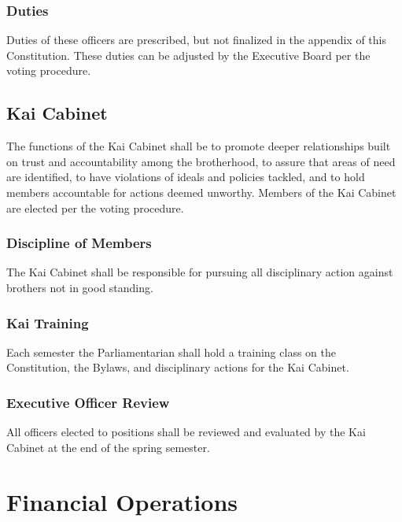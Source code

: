 \subsection{Duties}
\label{sec:duties}

Duties of these officers are prescribed, but not finalized in the appendix of
this Constitution.
These duties can be adjusted by the Executive Board per the voting procedure.

\section{Kai Cabinet}
\label{sec:kai-cabinet}

The functions of the Kai Cabinet shall be to promote deeper relationships built
on trust and accountability among the brotherhood, to assure that areas of need
are identified, to have violations of ideals and policies tackled, and to hold
members accountable for actions deemed unworthy.
Members of the Kai Cabinet are elected per the voting procedure.

\subsection{Discipline of Members}
\label{sec:discipline-of-members}

The Kai Cabinet shall be responsible for pursuing all disciplinary action
against brothers not in good standing.

\subsection{Kai Training}
\label{sec:kai-training}

Each semester the Parliamentarian shall hold a training class on the
Constitution, the Bylaws, and disciplinary actions for the Kai Cabinet.

\subsection{Executive Officer Review}
\label{sec:executive-officer-review}

All officers elected to positions shall be reviewed and evaluated by the Kai
Cabinet at the end of the spring semester.

\chapter{Financial Operations}
\label{cha:financial-operations}

